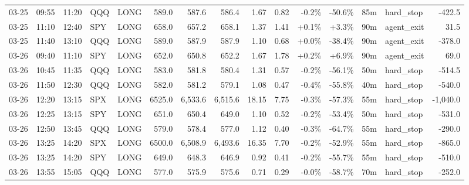 \documentclass[11pt,a4paper,twoside]{article}
\begin{document}
\begin{landscape}
\begin{center}
\begin{longtable}{>{\color{txtmain}}l l l l l r r r r r r r r >{\color{txtmain}}l r}
03-25 & 09:55 & 11:20 & QQQ & LONG & 589.0 & 587.6 & 586.4 & 1.67 & 0.82 & \textcolor{lossred}{-0.2\%} & \textcolor{lossred}{-50.6\%} & 85m & hard\_stop & \textcolor{lossred}{-422.5} \\
03-25 & 11:10 & 12:40 & SPY & LONG & 658.0 & 657.2 & 658.1 & 1.37 & 1.41 & \textcolor{wingreen}{+0.1\%} & \textcolor{wingreen}{+3.3\%} & 90m & agent\_exit & \textcolor{wingreen}{31.5} \\
03-25 & 11:40 & 13:10 & QQQ & LONG & 589.0 & 587.9 & 587.9 & 1.10 & 0.68 & \textcolor{wingreen}{+0.0\%} & \textcolor{lossred}{-38.4\%} & 90m & agent\_exit & \textcolor{lossred}{-378.0} \\
03-26 & 09:40 & 11:10 & SPY & LONG & 652.0 & 650.8 & 652.2 & 1.67 & 1.78 & \textcolor{wingreen}{+0.2\%} & \textcolor{wingreen}{+6.9\%} & 90m & agent\_exit & \textcolor{wingreen}{69.0} \\
03-26 & 10:45 & 11:35 & QQQ & LONG & 583.0 & 581.8 & 580.4 & 1.31 & 0.57 & \textcolor{lossred}{-0.2\%} & \textcolor{lossred}{-56.1\%} & 50m & hard\_stop & \textcolor{lossred}{-514.5} \\
03-26 & 11:50 & 12:30 & QQQ & LONG & 582.0 & 581.2 & 579.1 & 1.08 & 0.47 & \textcolor{lossred}{-0.4\%} & \textcolor{lossred}{-55.8\%} & 40m & hard\_stop & \textcolor{lossred}{-540.0} \\
03-26 & 12:20 & 13:15 & SPX & LONG & 6525.0 & 6,533.6 & 6,515.6 & 18.15 & 7.75 & \textcolor{lossred}{-0.3\%} & \textcolor{lossred}{-57.3\%} & 55m & hard\_stop & \textcolor{lossred}{-1,040.0} \\
03-26 & 12:25 & 13:15 & SPY & LONG & 651.0 & 650.4 & 649.0 & 1.10 & 0.52 & \textcolor{lossred}{-0.2\%} & \textcolor{lossred}{-53.4\%} & 50m & hard\_stop & \textcolor{lossred}{-531.0} \\
03-26 & 12:50 & 13:45 & QQQ & LONG & 579.0 & 578.4 & 577.0 & 1.12 & 0.40 & \textcolor{lossred}{-0.3\%} & \textcolor{lossred}{-64.7\%} & 55m & hard\_stop & \textcolor{lossred}{-290.0} \\
03-26 & 13:25 & 14:20 & SPX & LONG & 6500.0 & 6,508.9 & 6,493.6 & 16.35 & 7.70 & \textcolor{lossred}{-0.2\%} & \textcolor{lossred}{-52.9\%} & 55m & hard\_stop & \textcolor{lossred}{-865.0} \\
03-26 & 13:25 & 14:20 & SPY & LONG & 649.0 & 648.3 & 646.9 & 0.92 & 0.41 & \textcolor{lossred}{-0.2\%} & \textcolor{lossred}{-55.7\%} & 55m & hard\_stop & \textcolor{lossred}{-510.0} \\
03-26 & 13:55 & 15:05 & QQQ & LONG & 577.0 & 575.9 & 575.6 & 0.71 & 0.29 & \textcolor{lossred}{-0.0\%} & \textcolor{lossred}{-58.7\%} & 70m & hard\_stop & \textcolor{lossred}{-252.0} \\

\end{longtable}
\end{center}
\end{landscape}
\end{document}

